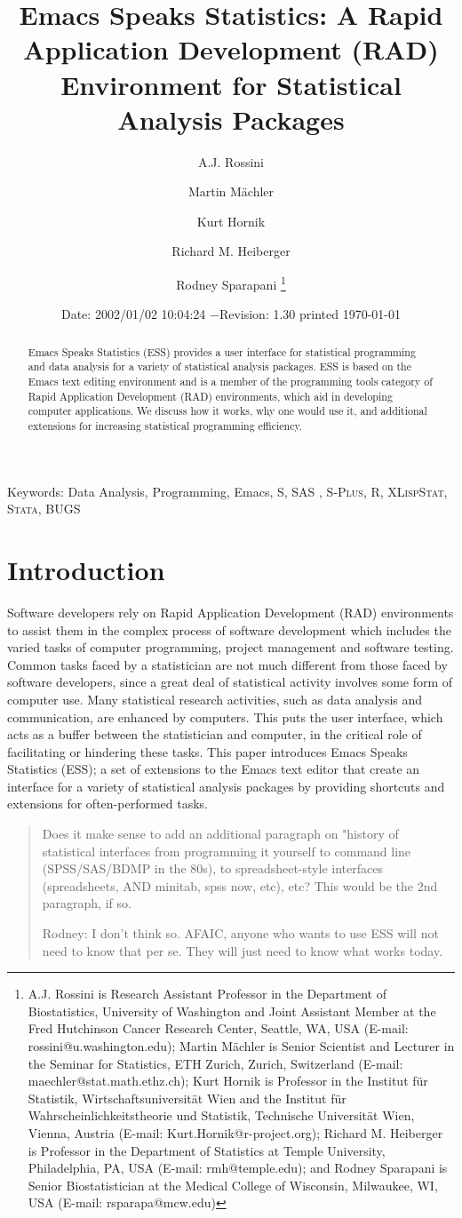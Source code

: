 \documentclass{article}
\title{Emacs Speaks Statistics:  A Rapid Application Development (RAD)
  Environment for Statistical Analysis Packages}
\author{A.J. Rossini \and Martin M{\"a}chler \and Kurt Hornik \and Richard
  M. Heiberger \and Rodney Sparapani \footnote{%
    A.J. Rossini is Research Assistant Professor in the Department of
    Biostatistics, University of Washington and Joint Assistant Member at
    the Fred Hutchinson Cancer Research Center, Seattle, WA, USA
    (E-mail: rossini@u.washington.edu);
    Martin M{\"a}chler is Senior Scientist and Lecturer in the Seminar for
    Statistics, ETH Zurich, Zurich, Switzerland
    (E-mail: maechler@stat.math.ethz.ch);
    Kurt Hornik is Professor in the Institut f{\"u}r Statistik,
    Wirtschaftsuniversit{\"a}t Wien and the Institut f{\"u}r
    Wahrscheinlichkeitstheorie und Statistik, Technische Universit{\"a}t
    Wien, Vienna, Austria (E-mail: Kurt.Hornik@r-project.org);
    Richard M. Heiberger is Professor in the Department of Statistics at
    Temple University, Philadelphia, PA, USA (E-mail: rmh@temple.edu);
    and Rodney Sparapani is Senior Biostatistician at the Medical College
    of Wisconsin, Milwaukee, WI, USA (E-mail: rsparapa@mcw.edu)}}
\date{$ $Date: 2002/01/02 10:04:24 $ - $Revision: 1.30 $ $\tiny printed \today}
\newcommand*{\SAS}{\textsc{SAS}{\textregistered} }
\newcommand*{\Splus}{\textsc{S-Plus}}
\newcommand*{\XLispStat}{\textsc{XLispStat}}
\newcommand*{\Stata}{\textsc{Stata}}
\begin{document}
\maketitle

\begin{abstract}
  Emacs Speaks Statistics (ESS) provides a user interface for
  statistical programming and data analysis for a variety
  of statistical analysis packages.  ESS
  is based on the Emacs text editing environment and is a member of
  the programming tools category of Rapid Application
  Development (RAD) environments, which aid in developing
  computer applications.  We discuss how it works, why one
  would use it, and additional extensions for increasing
  statistical programming efficiency.
\end{abstract}

\noindent Keywords: Data Analysis, Programming, Emacs, S, \SAS,
\Splus, R, \XLispStat, \Stata, BUGS


\section{Introduction}
\label{sec:introduction}

Software developers rely on Rapid Application Development (RAD)
environments to assist them in the complex process of software
development which includes the varied tasks of computer
programming, project management and software testing.
Common tasks faced by a statistician are not much different from those
faced by software developers, since a great deal of statistical
activity involves some form of computer use.  Many
statistical research activities, such as data analysis and
communication, are enhanced by computers.  This puts the user
interface, which acts as a buffer between the statistician and
computer, in the critical role of facilitating or hindering these
tasks.  This paper introduces Emacs Speaks Statistics (ESS);
a set of extensions to the Emacs text editor that create an interface
for a variety of statistical analysis packages by
providing shortcuts and extensions for often-performed tasks.

\begin{quote}
 Does it make sense to add an additional paragraph on "history of
statistical interfaces from programming it yourself to command line
(SPSS/SAS/BDMP in the 80s), to spreadsheet-style interfaces
(spreadsheets, AND minitab, spss now, etc), etc?  This would be the
2nd paragraph, if so.

Rodney:  I don't think so.
AFAIC, anyone who wants to use ESS will not need to know
that per se.  They will just need to know what works today.
\end{quote}
\end{document}

